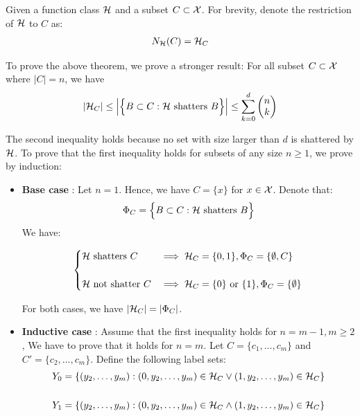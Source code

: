 \begin{proof*}
    Given a function class $\mathcal{H}$ and a subset $C\subset\mathcal{X}$. For brevity, denote the restriction of $\mathcal{H}$ to $C$ as:
    \begin{align*}
        N_{\mathcal{H}}(C) = \mathcal{H}_C
    \end{align*}

    \noindent To prove the above theorem, we prove a stronger result: For all subset $C\subset\mathcal{X}$ where $|C|=n$, we have
    \begin{align*}
        |\mathcal{H}_C| \le \Big| 
            \Big\{ 
                B \subset C : \mathcal{H} \text{ shatters } B
             \Big\}
         \Big| \le \sum_{k=0}^d \begin{pmatrix}
            n\\k
        \end{pmatrix}
    \end{align*}

    \noindent The second inequality holds because no set with size larger than $d$ is shattered by $\mathcal{H}$. To prove that the first inequality holds for subsets of any size $n\ge1$, we prove by induction:

    \begin{itemize}
        \item \textbf{Base case} : Let $n=1$. Hence, we have $C=\{x\}$ for $x\in\mathcal{X}$. Denote that:
        \begin{align*}
            \Phi_C = \Big\{ 
                B \subset C : \mathcal{H} \text{ shatters } B
             \Big\}
        \end{align*}
        \noindent We have:
        
        \[
            \begin{cases}
                \mathcal{H} \text{ shatters } C &\implies \mathcal{H}_C = \{0,1\} , \Phi_C = \{\emptyset, C\}
                \\ \\
                \mathcal{H} \text{ not shatter } C &\implies \mathcal{H}_C = \{0\} \text{ or } \{1\} , \Phi_C = \{\emptyset\}
            \end{cases}  
        \]

        \noindent For both cases, we have $|\mathcal{H}_C| = |\Phi_C|$.

        \item \textbf{Inductive case} : Assume that the first inequality holds for $n=m-1, m \ge 2$, We have to prove that it holds for $n=m$. Let $C=\{c_1, \dots, c_m\}$ and $C'=\{c_2, \dots, c_m\}$. Define the following label sets:
        \begin{align*}
            Y_0 &= \{(y_2, \dots, y_m) : (0, y_2, \dots, y_m) \in \mathcal{H}_C \vee (1, y_2, \dots, y_m) \in \mathcal{H}_C \}
            \\ \\
            Y_1 &= \{(y_2, \dots, y_m) : (0, y_2, \dots, y_m) \in \mathcal{H}_C \wedge (1, y_2, \dots, y_m) \in \mathcal{H}_C\}
        \end{align*}


\end{itemize}
\end{proof*}
